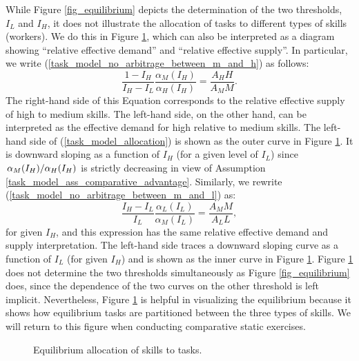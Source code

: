 \documentclass[12pt]{article}
\theoremstyle{definition}
\begin{document}
While Figure \ref{fig_equilibrium} depicts the determination of the two thresholds, $I_L$ and $I_H$, it does not illustrate the allocation of tasks to different types of skills (workers). We do this in Figure \ref{fig_allocation}, which can also be interpreted as a diagram showing ``relative effective demand'' and ``relative effective supply''. In particular, we write (\ref{task_model_no_arbitrage_between_m_and_h}) as follows:
\begin{equation}
    \label{task_model_allocation}
    \frac{1-I_H}{I_H-I_L} \frac{\alpha_M\left(I_H\right)}{\alpha_H\left(I_H\right)}=\frac{A_H H}{A_M M} .
\end{equation}
The right-hand side of this Equation corresponds to the relative effective supply of high to medium skills. The left-hand side, on the other hand, can be interpreted as the effective demand for high relative to medium skills. The left-hand side of (\ref{task_model_allocation}) is shown as the outer curve in Figure \ref{fig_allocation}. It is downward sloping as a function of $I_H$ (for a given level of $I_L$) since $\alpha_M{\left( I_H \right)} / \alpha_H{\left( I_H \right)}$ is strictly decreasing in view of Assumption \ref{task_model_ass_comparative_advantage}. Similarly, we rewrite (\ref{task_model_no_arbitrage_between_m_and_l}) as:
$$
\frac{I_H-I_L}{I_L} \frac{\alpha_L\left(I_L\right)}{\alpha_M\left(I_L\right)}=\frac{A_M M}{A_L L},
$$
for given $I_H$, and this expression has the same relative effective demand and supply interpretation. The left-hand side traces a downward sloping curve as a function of $I_L$ (for given $I_H$) and is shown as the inner curve in Figure \ref{fig_allocation}. Figure \ref{fig_allocation} does not determine the two thresholds simultaneously as Figure \ref{fig_equilibrium} does, since the dependence of the two curves on the other threshold is left implicit. Nevertheless, Figure \ref{fig_allocation} is helpful in visualizing the equilibrium because it shows how equilibrium tasks are partitioned between the three types of skills. We will return to this figure when conducting comparative static exercises.

\begin{figure}[H]
    \noindent\caption{Equilibrium allocation of skills to tasks.}
    \begin{center}
        \label{fig_allocation}
    \end{center}
\end{figure}
\end{document}
